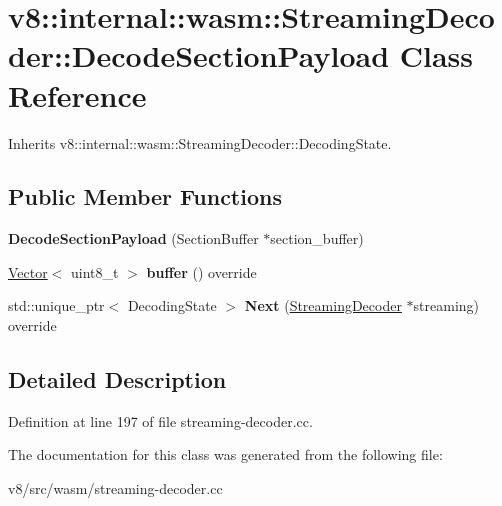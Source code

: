 \hypertarget{classv8_1_1internal_1_1wasm_1_1StreamingDecoder_1_1DecodeSectionPayload}{}\section{v8\+:\+:internal\+:\+:wasm\+:\+:Streaming\+Decoder\+:\+:Decode\+Section\+Payload Class Reference}
\label{classv8_1_1internal_1_1wasm_1_1StreamingDecoder_1_1DecodeSectionPayload}


Inherits v8\+::internal\+::wasm\+::\+Streaming\+Decoder\+::\+Decoding\+State.

\subsection*{Public Member Functions}
\begin{DoxyCompactItemize}
\item 
\mbox{\label{classv8_1_1internal_1_1wasm_1_1StreamingDecoder_1_1DecodeSectionPayload_a2b3c593b3c3cd8cd21d588473b52a6cd}} 
{\bfseries Decode\+Section\+Payload} (Section\+Buffer $\ast$section\+\_\+buffer)
\item 
\mbox{\label{classv8_1_1internal_1_1wasm_1_1StreamingDecoder_1_1DecodeSectionPayload_adc97f06601064566d5a115ac9c6fbf2a}} 
\mbox{\hyperlink{classv8_1_1internal_1_1Vector}{Vector}}$<$ uint8\+\_\+t $>$ {\bfseries buffer} () override
\item 
\mbox{\label{classv8_1_1internal_1_1wasm_1_1StreamingDecoder_1_1DecodeSectionPayload_ae64a353bfdc0dde1d6166b5a41c50176}} 
std\+::unique\+\_\+ptr$<$ Decoding\+State $>$ {\bfseries Next} (\mbox{\hyperlink{classv8_1_1internal_1_1wasm_1_1StreamingDecoder}{Streaming\+Decoder}} $\ast$streaming) override
\end{DoxyCompactItemize}


\subsection{Detailed Description}


Definition at line 197 of file streaming-\/decoder.\+cc.



The documentation for this class was generated from the following file\+:\begin{DoxyCompactItemize}
\item 
v8/src/wasm/streaming-\/decoder.\+cc\end{DoxyCompactItemize}
